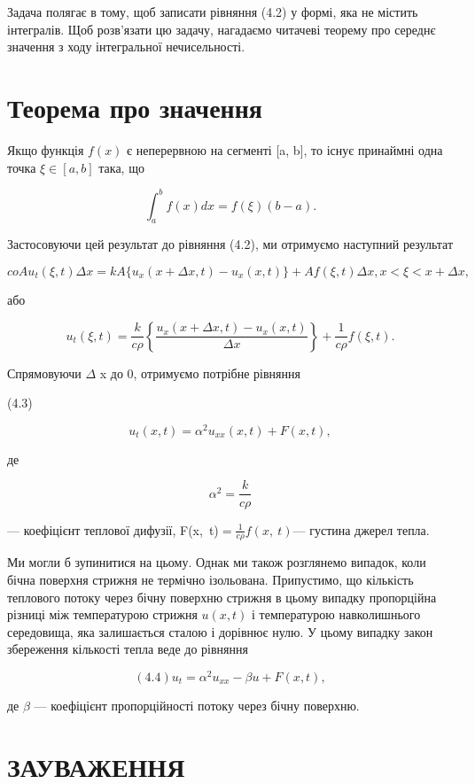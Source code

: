 \documentclass[
  ukrainian,
]{article}
\begin{document}
Задача полягає в тому, щоб записати рівняння (4.2) у формі, яка не
містить інтегралів. Щоб розв'язати цю задачу, нагадаємо читачеві теорему
про середнє значення з ходу інтегральної нечисельності.

\section{Теорема про
значення}\label{ux442ux435ux43eux440ux435ux43cux430-ux43fux440ux43e-ux437ux43dux430ux447ux435ux43dux43dux44f}

Якщо функція \(f(x)\) є неперервною на сегменті {[}a, b{]}, то існує
принаймні одна точка \(\xi \in [a, b]\) така, що

\[
\int_{a}^{b} f(x) dx = f(\xi) (b-a).
\]

Застосовуючи цей результат до рівняння (4.2), ми отримуємо наступний
результат

\[
coAu_{t}(\xi, t) \Delta x = kA\{u_{x}(x + \Delta x, t) - u_{x}(x, t)\} + Af(\xi, t) \Delta x,
x < \xi < x + \Delta x,
\]

або

\[
u_t(\xi, t) = \frac{k}{c\rho} \left\{ \frac{u_x(x + \Delta x, t) - u_x(x, t)}{\Delta x} \right\} + \frac{1}{c\rho} f(\xi, t).
\]

Спрямовуючи \(\Delta\) x до 0, отримуємо потрібне рівняння

(4.3)

\[
u_t(x, t) = \alpha^2 u_{xx}(x, t) + F(x, t),
\]

де

\[
\alpha^{2}=\frac{k}{c\rho}
\]

--- коефіцієнт теплової дифузії,
F\left(x,~t\right)\(=\frac{1}{c\rho}f\left(x,\ t\right)\)--- густина
джерел тепла.

Ми могли б зупинитися на цьому. Однак ми також розглянемо випадок, коли
бічна поверхня стрижня не термічно ізольована. Припустимо, що кількість
теплового потоку через бічну поверхню стрижня в цьому випадку
пропорційна різниці між температурою стрижня \(u(x,t)\) і температурою
навколишнього середовища, яка залишається сталою і дорівнює нулю. У
цьому випадку закон збереження кількості тепла веде до рівняння

\[
(4.4) u_t = \alpha^2 u_{xx} - \beta u + F(x, t),
\]

де \(\beta\) --- коефіцієнт пропорційності потоку через бічну поверхню.

\section{ЗАУВАЖЕННЯ}\label{ux437ux430ux443ux432ux430ux436ux435ux43dux43dux44f-3}
\end{document}
